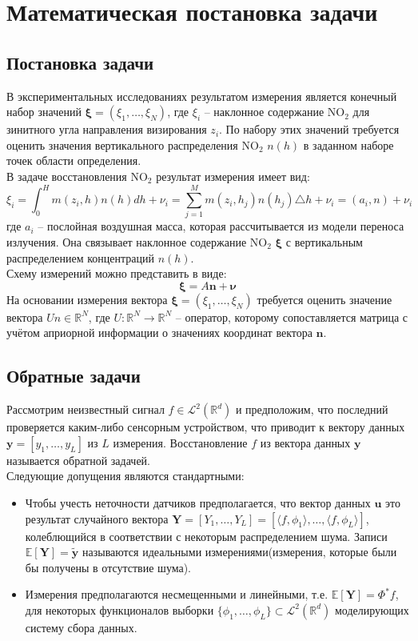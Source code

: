 \documentclass[a4paper,12pt]{article}
\theoremstyle{plain}
\theoremstyle{definition}
\theoremstyle{remark}
\newcommand{\nl}{\\ \indent}
\begin{document}
\tableofcontents
\newpage
\section{Математическая постановка задачи}
\subsection{Постановка задачи}
В экспериментальных исследованиях результатом 
измерения является конечный набор значений
$\pmb{\xi} = (\xi_1, \ldots, \xi_N)$,
где $\xi_i$ -- наклонное содержание
$\text{NO}_2$ для зинитного угла направления
визирования $z_i$.
По набору этих значений требуется оценить значения вертикального
распределения $\text{NO}_2$ $n(h)$ в заданном наборе точек
области определения.
\nl
В задаче восстановления $\text{NO}_2$ результат измерения
имеет вид:
\begin{equation}
\xi_i = 
\int_{0}^{H}m(z_i, h)n(h)dh + \nu_i =
\sum\limits_{j=1}^{M}m(z_i, h_j) n(h_j) \triangle h
+ \nu_i = (a_i, n) + \nu_i
\end{equation}
где $a_i$ -- послойная воздушная масса,
которая рассчитывается из модели переноса излучения.
Она связывает наклонное содержание
$\text{NO}_2$ $\pmb{\xi}$
с вертикальным распределением концентраций $n(h)$.
\nl
Схему измерений можно представить в виде:
\begin{equation}
\pmb\xi = A \pmb{n} + \pmb{\nu}
\end{equation}
На основании измерения вектора
$\pmb\xi = (\xi_1, \ldots, \xi_N)$
требуется оценить значение вектора
$Un \in \mathbb{R}^N$, 
где $U: \mathbb{R}^N \rightarrow \mathbb{R}^N$ --
оператор, которому сопоставляется матрица с учётом 
априорной информации о значениях координат вектора $\pmb{n}$.
\subsection{Обратные задачи}
Рассмотрим неизвестный сигнал 
$f \in \mathcal{L}^2(\mathbb{R}^d)$ и предположим, 
что последний проверяется каким-либо сенсорным устройством, 
что приводит к вектору данных 
$\textbf{y} = [y_1, \ldots, y_L]$ из $L$ измерения. 
Восстановление $f$ из вектора данных $\textbf{y}$ 
называется обратной задачей.
\nl
Следующие допущения являются стандартными:
\begin{itemize}
\item Чтобы учесть неточности датчиков предполагается, 
что вектор данных $\textbf{u}$ это результат 
случайного вектора 
$\textbf{Y} = [Y_1, \ldots , Y_L] =
\left[ 
\langle f, \phi_1 \rangle,
\ldots ,
\langle f, \phi_L \rangle
\right]$, 
колеблющийся в соответствии с некоторым распределением шума. 
Записи $\mathbb{E}[\textbf{Y}] = \widetilde{\textbf{y}}$ 
называются идеальными измерениями(измерения, которые были бы получены в отсутствие шума).
\item Измерения предполагаются несмещенными и линейными,
т.е.
$\mathbb{E}[\textbf{Y}] = \Phi^{*}f$, 
для некоторых функционалов выборки 
$\{ \phi_1, \ldots , \phi_L \} 
\subset \mathcal{L}^2(\mathbb{R}^d)$ 
моделирующих систему сбора данных.
\end{itemize}
\end{document}
